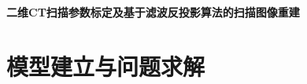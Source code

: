 \documentclass{cumcmthesis}
\title{}
\begin{document}
{\centering {}\bfseries 二维CT扫描参数标定及基于滤波反投影算法的扫描图像重建 \par}





\section{模型建立与问题求解}









\nocite{*}

\printbibliography[heading=bibliography,title=参考文献]

\clearpage

\renewcommand{\theHsection}{A\arabic{section}}
\appendix

\clearpage

\end{document}
